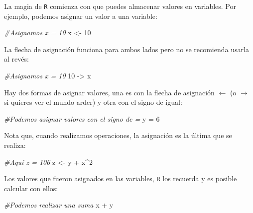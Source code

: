 \documentclass[
]{book}
\newenvironment{Shaded}{\begin{snugshade}}{\end{snugshade}}
\newcommand{\CommentTok}[1]{\textcolor[rgb]{0.56,0.35,0.01}{\textit{#1}}}
\newcommand{\DecValTok}[1]{\textcolor[rgb]{0.00,0.00,0.81}{#1}}
\newcommand{\NormalTok}[1]{#1}
\newcommand{\OtherTok}[1]{\textcolor[rgb]{0.56,0.35,0.01}{#1}}
\newcommand{\SpecialCharTok}[1]{\textcolor[rgb]{0.00,0.00,0.00}{#1}}
\begin{document}
La magia de \texttt{R} comienza con que puedes almacenar valores en variables. Por ejemplo, podemos asignar un valor a una variable:

\begin{Shaded}
\begin{Highlighting}[]
\CommentTok{\#Asignamos x = 10}
\NormalTok{x }\OtherTok{\textless{}{-}} \DecValTok{10}
\end{Highlighting}
\end{Shaded}

La flecha de asignación funciona para ambos lados pero no se recomienda usarla al revés:

\begin{Shaded}
\begin{Highlighting}[]
\CommentTok{\#Asignamos x = 10}
\DecValTok{10} \OtherTok{{-}\textgreater{}}\NormalTok{ x}
\end{Highlighting}
\end{Shaded}

Hay dos formas de asignar valores, una es con la flecha de asignación \(\leftarrow\) (o \(\rightarrow\) si quieres ver el mundo arder) y otra con el signo de igual:

\begin{Shaded}
\begin{Highlighting}[]
\CommentTok{\#Podemos asignar valores con el signo de =}
\NormalTok{y }\OtherTok{=} \DecValTok{6}
\end{Highlighting}
\end{Shaded}

Nota que, cuando realizamos operaciones, la asignación es la última que se realiza:

\begin{Shaded}
\begin{Highlighting}[]
\CommentTok{\#Aquí z = 106}
\NormalTok{z }\OtherTok{\textless{}{-}}\NormalTok{ y }\SpecialCharTok{+}\NormalTok{ x}\SpecialCharTok{\^{}}\DecValTok{2}
\end{Highlighting}
\end{Shaded}

Los valores que fueron asignados en las variables, \texttt{R} los recuerda y es posible calcular con ellos:

\begin{Shaded}
\begin{Highlighting}[]
\CommentTok{\#Podemos realizar una suma}
\NormalTok{x }\SpecialCharTok{+}\NormalTok{ y}
\end{Highlighting}
\end{Shaded}
\end{document}
